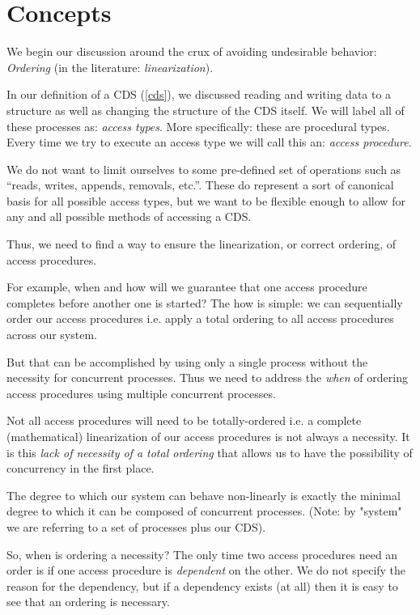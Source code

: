 \section{Concepts}

We begin our discussion around the crux of avoiding undesirable behavior: \textit{Ordering} (in the literature: \textit{linearization}).

In our definition of a CDS (\ref{cds}), we discussed reading and writing data to a structure as well as changing the structure of the CDS itself. We will label all of these processes as: \textit{access types}. More specifically: these are procedural types. Every time we try to execute an access type we will call this an: \textit{access procedure}.

We do not want to limit ourselves to some pre-defined set of operations such as ``reads, writes, appends, removals, etc.''. These do represent a sort of canonical basis for all possible access types, but we want to be flexible enough to allow for any and all possible methods of accessing a CDS.

Thus, we need to find a way to ensure the linearization, or correct ordering, of access procedures. 

For example, when and how will we guarantee that one access procedure completes before another one is started? The how is simple: we can sequentially order our access procedures i.e. apply a total ordering to all access procedures across our system. 

But that can be accomplished by using only a single process without the necessity for concurrent processes. Thus we need to address the \textit{when} of ordering access procedures using multiple concurrent processes.

Not all access procedures will need to be totally-ordered i.e. a complete (mathematical) linearization of our access procedures is not always a necessity. It is this \textit{lack of necessity of a total ordering} that allows us to have the possibility of concurrency in the first place. 

The degree to which our system can behave non-linearly is exactly the minimal degree to which it can be composed of concurrent processes. (Note: by "system" we are referring to a set of processes plus our CDS).

So, when is ordering a necessity? The only time two access procedures need an order is if one access procedure is \textit{dependent} on the other. We do not specify the reason for the dependency, but if a dependency exists (at all) then it is easy to see that an ordering is necessary.

